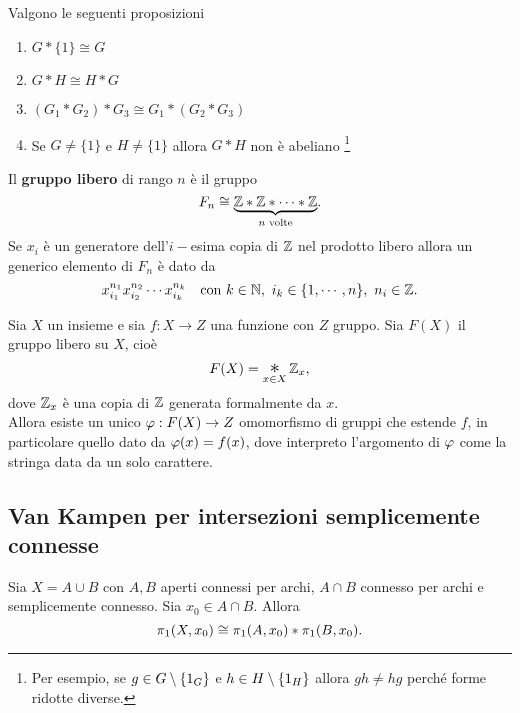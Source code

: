 \begin{multicols*}{2}
\begin{fact}
Valgono le seguenti proposizioni
\begin{enumerate}[noitemsep]
\item $G\ast\{1\}\cong G$
\item $G\ast H\cong H\ast G$
\item $(G_1\ast G_2)\ast G_3\cong G_1\ast(G_2\ast G_3)$
\item Se $G\neq \{1\}$ e $H\neq \{1\}$ allora $G\ast H$ non \`e abeliano \footnote{Per esempio, se $g\in G\setminus\{1_G\}$ e $h\in H\setminus\{1_H\}$ allora $gh\neq hg$ perch\'e forme ridotte diverse.}
\end{enumerate}
\end{fact}

\begin{definition}
Il \textbf{gruppo libero} di rango $n$ \`e il gruppo
\[F_n\cong \underset{n\text{ volte}}{\underbrace{\mathbb{Z}\ast\mathbb{Z}\ast\cdots\ast\mathbb{Z}}}.\]
Se $x_i$ \`e un generatore dell'$i-$esima copia di $\mathbb{Z}$ nel prodotto libero allora un generico elemento di $F_n$ \`e dato da
\[x_{i_1}^{n_1}x_{i_2}^{n_2}\cdots x_{i_k}^{n_k}\quad \text{con }k\in\N,\ i_k\in\{1,\cdots,n\},\ n_i\in\Z.\]
\end{definition}

\begin{theorem}\label{ProprietaUniversaleGruppoLibero}
Sia $X$ un insieme e sia $f:X\to Z$ una funzione con $Z$ gruppo. Sia $F(X)$ il gruppo libero su $X$, cio\`e
\[F(X)=\bigast_{x\in X}\Z_x,\]
dove $\mathbb{Z}_x$ \`e una copia di $\mathbb{Z}$ generata formalmente da $x$.\\
Allora esiste un unico $\varphi:F(X)\to Z$ omomorfismo di gruppi che estende $f$, in particolare quello dato da $\varphi(x)=f(x)$, dove interpreto l'argomento di $\varphi$ come la stringa data da un solo carattere.
\end{theorem}

\subsection{Van Kampen per intersezioni semplicemente connesse}
\begin{lemma}\label{VanKampenIntersezioneSemplicementeConnessa}
Sia $X=A\cup B$ con $A,B$ aperti connessi per archi, $A\cap B$ connesso per archi e semplicemente connesso. Sia $x_0\in A\cap B$. Allora
\[\pi_1(X,x_0)\cong \pi_1(A,x_0)\ast \pi_1(B,x_0).\]
\end{lemma}



\end{multicols*}
